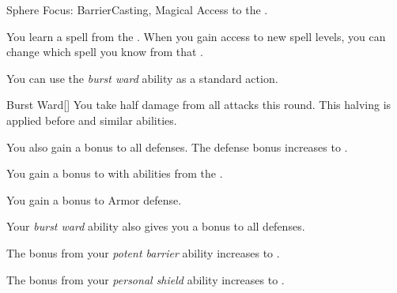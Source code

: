    \begin{feat}{Sphere Focus: Barrier}{Casting, Magical}
        \featpre Access to the  .

         You learn a spell from the  .
        When you gain access to new spell levels, you can change which spell you know from that .

         You can use the \textit{burst ward} ability as a standard action.
        \begin{freeability}{Burst Ward}[]
            You take half damage from all attacks this round.
            This halving is applied before  and similar abilities.

            \rankline
             You also gain a  bonus to all defenses.
             The defense bonus increases to .
        \end{freeability}

         You gain a  bonus to  with abilities from the  .

         You gain a  bonus to Armor defense.

         Your \textit{burst ward} ability also gives you a  bonus to all defenses.

         The bonus from your \textit{potent barrier} ability increases to .

         The bonus from your \textit{personal shield} ability increases to .
    \end{feat}

